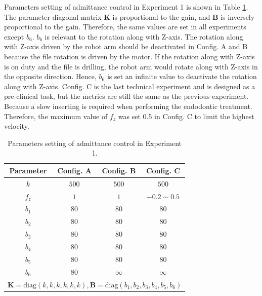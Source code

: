 \par
Parameters setting of admittance control in Experiment 1 is shown in Table \ref{tab: para_adm_exp1}. The parameter diagonal matrix $\mathbf{K}$ is proportional to the gain, and $\mathbf{B}$ is inversely proportional to the gain. Therefore, the same values are set in all experiments except $b_6$. $b_6$ is relevant to the rotation along with Z-axis. The rotation along with Z-axis driven by the robot arm should be deactivated in Config. A and B because the file rotation is driven by the motor. If the rotation along with Z-axis is on duty and the file is drilling, the robot arm would rotate along with Z-axis in the opposite direction. Hence, $b_6$ is set an infinite value to deactivate the rotation along with Z-axis. Config. C is the last technical experiment and is designed as a pre-clinical task, but the metrics are still the same as the previous experiment. Because a slow inserting is required when performing the endodontic treatment. Therefore, the maximum value of $f_z$ was set $0.5$ in Config. C to limit the highest velocity. 
\par
\begin{table}[htbp]
\centering
\tabcolsep=22pt
\caption{Parameters setting of admittance control in Experiment 1.}
\label{tab: para_adm_exp1}
\begin{tabular}{cccc} 
\hline \hline
Parameter	&Config. A	&Config. B	&Config. C			\\
\hline
$k$			&$500$		&$500$		&$500$				\\
$f_z$		&$1$		&$1$		&$-0.2 \sim 0.5$	\\
$b_1$		&$80$		&$80$		&$80$				\\
$b_2$		&$80$		&$80$		&$80$				\\
$b_3$		&$80$		&$80$		&$80$				\\
$b_4$		&$80$		&$80$		&$80$				\\
$b_5$		&$80$		&$80$		&$80$				\\
$b_6$		&$80$		&$\infty$	&$\infty$			\\
\hline
\multicolumn{4}{c}{ $\mathbf{K} = \text{diag}(k,k,k,k,k,k), \mathbf{B} = \text{diag}(b_1,b_2,b_3,b_4,b_5,b_6)$} \\
\hline\hline	
\end{tabular}
\end{table}

